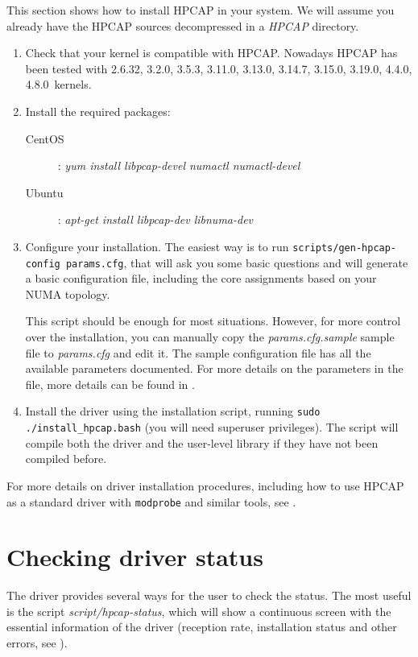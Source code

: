 \documentclass[a4paper,oneside]{hpman}
\newcommand{\supportedkernels}{2.6.32, 3.2.0, 3.5.3, 3.11.0, 3.13.0, 3.14.7, 3.15.0, 3.19.0, 4.4.0, 4.8.0}
\begin{document}
This section shows how to install HPCAP in your system. We will assume you already have the HPCAP sources decompressed in a \textit{HPCAP} directory.

\begin{enumerate}
\item Check that your kernel is compatible with HPCAP. Nowadays HPCAP has been tested with \supportedkernels\ kernels.

\item Install the required packages:
\begin{description}
\item[CentOS]: \textit{yum install libpcap-devel numactl numactl-devel}
\item[Ubuntu]: \textit{apt-get install libpcap-dev libnuma-dev}
\end{description}

\item Configure your installation. The easiest way is to run \texttt{scripts/gen-hpcap-config params.cfg}, that will ask you some basic questions and will generate a basic configuration file, including the core assignments based on your NUMA topology.
\vspace{2pt}

This script should be enough for most situations. However, for more control over the installation, you can manually copy the \textit{params.cfg.sample} sample file to \textit{params.cfg} and edit it. The sample configuration file has all the available parameters documented. For more details on the parameters in the file, more details can be found in .

\item Install the driver using the installation script, running \texttt{sudo ./install\_hpcap.bash} (you will need superuser privileges). The script will compile both the driver and the user-level library if they have not been compiled before.
\end{enumerate}

For more details on driver installation procedures, including how to use HPCAP as a standard driver with \texttt{modprobe} and similar tools, see .

\section{Checking driver status}
\label{sec:QuickStatus}

The driver provides several ways for the user to check the status. The most useful is the script \textit{script/hpcap-status}, which will show a continuous screen with the essential information of the driver (reception rate, installation status and other errors, see ).
\end{document}

